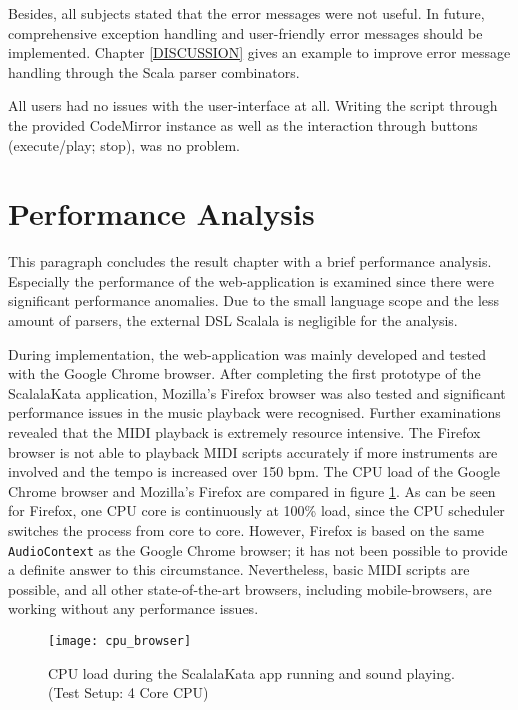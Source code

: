 Besides, all subjects stated that the error messages were not useful. In future, comprehensive exception handling and user-friendly error messages should be implemented. Chapter \ref{DISCUSSION} gives an example to improve error message handling through the Scala parser combinators.

All users had no issues with the user-interface at all. Writing the script through the provided CodeMirror instance as well as the interaction through buttons (execute/play; stop), was no problem.

\section{Performance Analysis}
\label{RESULTS_PERFOMANCE}
This paragraph concludes the result chapter with a brief performance analysis. Especially the performance of the web-application is examined since there were significant performance anomalies. Due to the small language scope and the less amount of parsers, the external DSL Scalala is negligible for the analysis.

During implementation, the web-application was mainly developed and tested with the Google Chrome browser. After completing the first prototype of the ScalalaKata application, Mozilla's Firefox browser was also tested and significant performance issues in the music playback were recognised. Further examinations revealed that the MIDI playback is extremely resource intensive. The Firefox browser is not able to playback MIDI scripts accurately if more instruments are involved and the tempo is increased over 150 bpm. The CPU load of the Google Chrome browser and Mozilla's Firefox are compared in figure \ref{IMG_CPU_BROWSER}. As can be seen for Firefox, one CPU core is continuously at 100\% load, since the CPU scheduler switches the process from core to core. However, Firefox is based on the same \texttt{AudioContext} as the Google Chrome browser; it has not been possible to provide a definite answer to this circumstance. Nevertheless, basic MIDI scripts are possible, and all other state-of-the-art browsers, including mobile-browsers, are working without any performance issues.

\begin{figure}[h]
\caption{CPU load during the ScalalaKata app running and sound playing. (Test Setup: 4 Core CPU)}
\label{IMG_CPU_BROWSER}
\texttt{[image: cpu\_browser]}
\end{figure}















